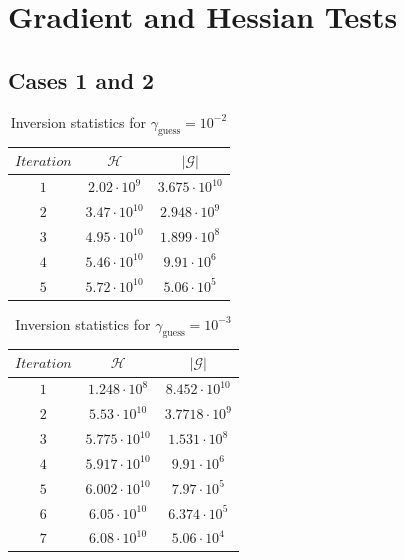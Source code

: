 \documentclass[12pt]{article}
\begin{document}



\appendix
\section{Gradient and Hessian Tests}
\subsection{Cases 1 and 2}
\begin{table}[H]
		\caption{Inversion statistics for $\gamma_{\text{guess}}= 10^{-2}$} %
		\centering  %
		\begin{tabular}{c c c } %
		\hline \hline                        %
 		$Iteration$&$\mathcal H$ &$|\mathcal G|$   \\ [0.5ex] %
		\hline                  %
                $1$&$2.02\cdot 10^{9}$&$3.675\cdot 10^{10}$   \\
		$2$&$3.47\cdot 10^{10}$&$2.948\cdot 10^{9}$   \\
                $3$&$4.95\cdot 10^{10}$&$1.899\cdot 10^{8}$   \\
		$4$&$5.46\cdot 10^{10}$&$9.91\cdot 10^{6}$   \\
		$5$&$5.72\cdot 10^{10}$&$5.06\cdot 10^{5}$   \\

                \hline %
		\end{tabular}
		\label{table:gradcheck1} %
		\end{table}
 

\begin{table}[H]
		\caption{Inversion statistics for $\gamma_{\text{guess}}= 10^{-3}$} %
		\centering  %
		\begin{tabular}{c c c } %
		\hline \hline                        %
 		$Iteration$&$\mathcal H$ &$|\mathcal G|$   \\ [0.5ex] %
		\hline                  %
                $1$&$1.248\cdot 10^{8}$&$8.452\cdot 10^{10}$   \\
		$2$&$5.53\cdot 10^{10}$&$3.7718\cdot 10^{9}$   \\
                $3$&$5.775\cdot 10^{10}$&$1.531\cdot 10^{8}$   \\
		$4$&$5.917\cdot 10^{10}$&$9.91\cdot 10^{6}$   \\
		$5$&$6.002\cdot 10^{10}$&$7.97\cdot 10^{5}$   \\
	        $6$&$6.05\cdot 10^{10}$&$6.374\cdot 10^{5}$   \\
        	$7$&$6.08\cdot 10^{10}$&$5.06\cdot 10^{4}$   \\
        
                \hline %
		\end{tabular}
		\label{table:gradcheck2} %
		\end{table}
\end{document}
